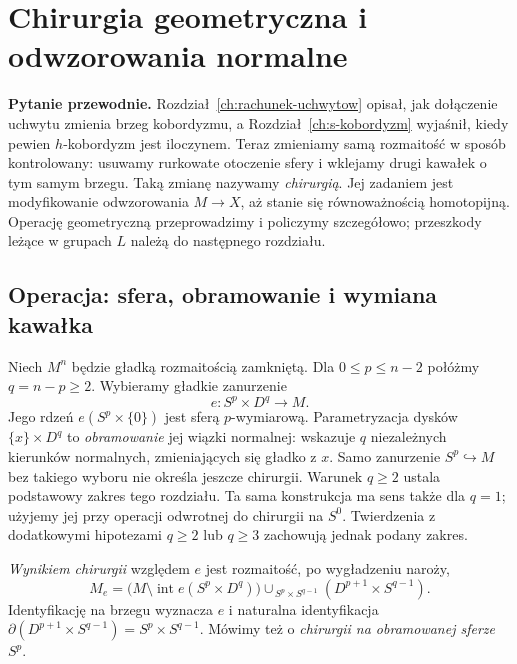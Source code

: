 \chapter{Chirurgia geometryczna i odwzorowania normalne}
\label{ch:chirurgia-geometryczna-21}

\noindent\textbf{Pytanie przewodnie.}
Rozdział~\ref{ch:rachunek-uchwytow} opisał, jak dołączenie uchwytu
zmienia brzeg kobordyzmu, a Rozdział~\ref{ch:s-kobordyzm}
wyjaśnił, kiedy pewien $h$-kobordyzm jest iloczynem.
Teraz zmieniamy samą rozmaitość w sposób kontrolowany:
usuwamy rurkowate otoczenie sfery i wklejamy drugi kawałek
o tym samym brzegu. Taką zmianę nazywamy \emph{chirurgią}.
Jej zadaniem jest modyfikowanie odwzorowania $M\to X$,
aż stanie się równoważnością homotopijną.
Operację geometryczną przeprowadzimy i policzymy szczegółowo;
przeszkody leżące w grupach $L$ należą do następnego rozdziału.

\section{Operacja: sfera, obramowanie i wymiana kawałka}
\label{sec:krok-chirurgii-21}

Niech $M^n$ będzie gładką rozmaitością zamkniętą.
Dla $0\leq p\leq n-2$ połóżmy $q=n-p\geq2$.
Wybieramy gładkie zanurzenie
\[
 e:S^p\times D^q\longrightarrow M.
\]
Jego rdzeń $e(S^p\times\{0\})$ jest sferą $p$-wymiarową.
Parametryzacja dysków $\{x\}\times D^q$ to
\emph{obramowanie} jej wiązki normalnej: wskazuje $q$
niezależnych kierunków normalnych, zmieniających się
gładko z $x$. Samo zanurzenie $S^p\hookrightarrow M$
bez takiego wyboru nie określa jeszcze chirurgii.
Warunek $q\geq2$ ustala podstawowy zakres tego rozdziału.
Ta sama konstrukcja ma sens także dla $q=1$; użyjemy jej
przy operacji odwrotnej do chirurgii na $S^0$.
Twierdzenia z dodatkowymi hipotezami $q\geq2$ lub $q\geq3$
zachowują jednak podany zakres.

\begin{definicja}
\label{def:chirurgia-21}
\emph{Wynikiem chirurgii} względem $e$ jest
rozmaitość, po wygładzeniu naroży,
\begin{equation}\label{eq:chirurgia-21}
 M_e=\bigl(M\setminus\operatorname{int}e(S^p\times D^q)\bigr)
 \mathbin{\cup_{\,S^p\times S^{q-1}}}
 (D^{p+1}\times S^{q-1}).
\end{equation}
Identyfikację na brzegu wyznacza $e$ i naturalna
identyfikacja $\partial(D^{p+1}\times S^{q-1})
=S^p\times S^{q-1}$.
Mówimy też o \emph{chirurgii na obramowanej sferze $S^p$}.
\end{definicja}

